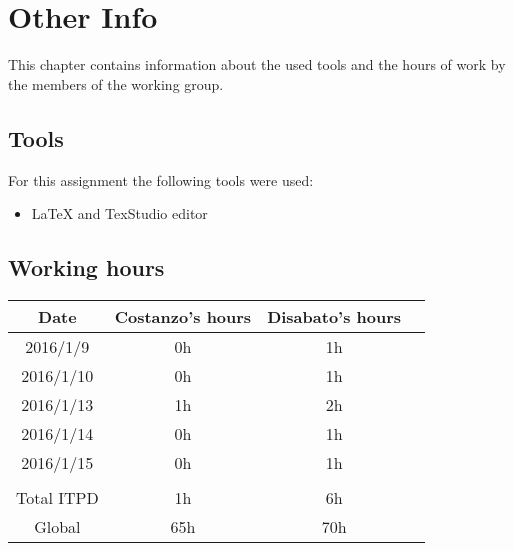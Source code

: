 \documentclass[\mainpath/main]{subfiles}
\begin{document}
\chapter{Other Info}
\label{OtherInfo}

\setmyfancystyle

This chapter contains information about the used tools and the hours of work by the members of the working group.

\section{Tools}
For this assignment the following tools were used:
\begin{itemize}
	\item \LaTeX{} and TexStudio editor
\end{itemize}

\section{Working hours}
\begin{table}[h!]
	\centering
\begin{tabular}{cccc}
\hline
Date       & Costanzo's hours & Disabato's hours  & \\ \hline
2016/1/9 & 0h 			  & 1h 			  & \\ \hline
2016/1/10 & 0h 			  & 1h 			  & \\ \hline
2016/1/13 & 1h 			  & 2h 			  & \\ \hline
2016/1/14 & 0h 			  & 1h 			  & \\ \hline
2016/1/15 & 0h 			  & 1h 			  & \\ \hline

\\
Total ITPD  & 1h 		      & 6h 			 	  & \\ \hline
Global 	   & 65h 		 	  & 70h 			  & \\ \hline

\end{tabular}
\end{table}
\end{document}
